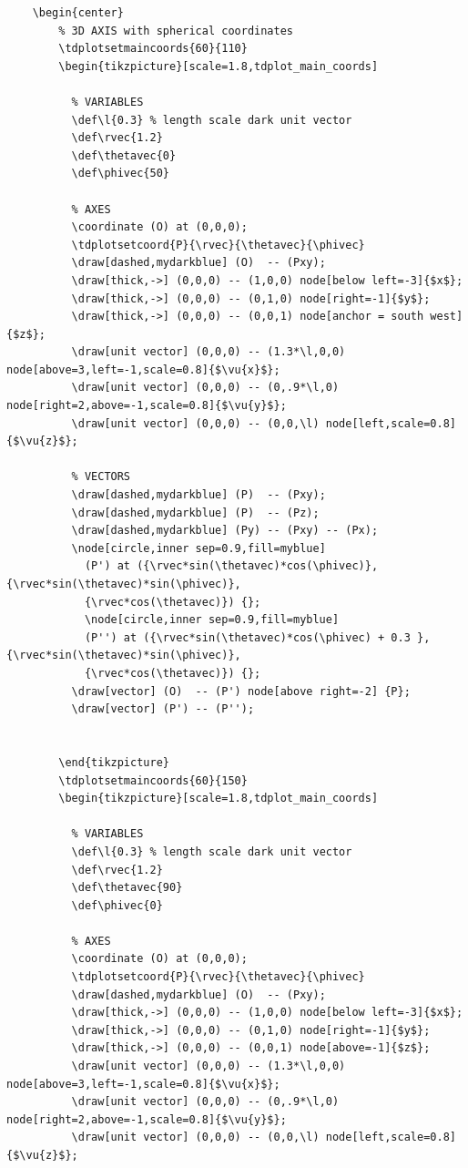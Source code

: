 \documentclass[letter, 10pts]{article}
\begin{document}
	\begin{multicols}{2}
\begin{tiny}\begin{verbatim}
	\begin{center}
		% 3D AXIS with spherical coordinates
		\tdplotsetmaincoords{60}{110}
		\begin{tikzpicture}[scale=1.8,tdplot_main_coords]
		  
		  % VARIABLES
		  \def\l{0.3} % length scale dark unit vector
		  \def\rvec{1.2}
		  \def\thetavec{0}
		  \def\phivec{50}
		  
		  % AXES
		  \coordinate (O) at (0,0,0);
		  \tdplotsetcoord{P}{\rvec}{\thetavec}{\phivec}
		  \draw[dashed,mydarkblue] (O)  -- (Pxy);
		  \draw[thick,->] (0,0,0) -- (1,0,0) node[below left=-3]{$x$};
		  \draw[thick,->] (0,0,0) -- (0,1,0) node[right=-1]{$y$};
		  \draw[thick,->] (0,0,0) -- (0,0,1) node[anchor = south west]{$z$};
		  \draw[unit vector] (0,0,0) -- (1.3*\l,0,0) node[above=3,left=-1,scale=0.8]{$\vu{x}$};
		  \draw[unit vector] (0,0,0) -- (0,.9*\l,0) node[right=2,above=-1,scale=0.8]{$\vu{y}$};
		  \draw[unit vector] (0,0,0) -- (0,0,\l) node[left,scale=0.8]{$\vu{z}$};
		  
		  % VECTORS
		  \draw[dashed,mydarkblue] (P)  -- (Pxy);
		  \draw[dashed,mydarkblue] (P)  -- (Pz);
		  \draw[dashed,mydarkblue] (Py) -- (Pxy) -- (Px);
		  \node[circle,inner sep=0.9,fill=myblue]
			(P') at ({\rvec*sin(\thetavec)*cos(\phivec)},{\rvec*sin(\thetavec)*sin(\phivec)},
			{\rvec*cos(\thetavec)}) {};
			\node[circle,inner sep=0.9,fill=myblue]
			(P'') at ({\rvec*sin(\thetavec)*cos(\phivec) + 0.3 },{\rvec*sin(\thetavec)*sin(\phivec)},
			{\rvec*cos(\thetavec)}) {};
		  \draw[vector] (O)  -- (P') node[above right=-2] {P};
		  \draw[vector] (P') -- (P''); 
		  
		
		\end{tikzpicture}
		\tdplotsetmaincoords{60}{150}
		\begin{tikzpicture}[scale=1.8,tdplot_main_coords]
		  
		  % VARIABLES
		  \def\l{0.3} % length scale dark unit vector
		  \def\rvec{1.2}
		  \def\thetavec{90}
		  \def\phivec{0}
		  
		  % AXES
		  \coordinate (O) at (0,0,0);
		  \tdplotsetcoord{P}{\rvec}{\thetavec}{\phivec}
		  \draw[dashed,mydarkblue] (O)  -- (Pxy);
		  \draw[thick,->] (0,0,0) -- (1,0,0) node[below left=-3]{$x$};
		  \draw[thick,->] (0,0,0) -- (0,1,0) node[right=-1]{$y$};
		  \draw[thick,->] (0,0,0) -- (0,0,1) node[above=-1]{$z$};
		  \draw[unit vector] (0,0,0) -- (1.3*\l,0,0) node[above=3,left=-1,scale=0.8]{$\vu{x}$};
		  \draw[unit vector] (0,0,0) -- (0,.9*\l,0) node[right=2,above=-1,scale=0.8]{$\vu{y}$};
		  \draw[unit vector] (0,0,0) -- (0,0,\l) node[left,scale=0.8]{$\vu{z}$};
		  

\end{verbatim}
\end{tiny}
\end{multicols}
\end{document}
